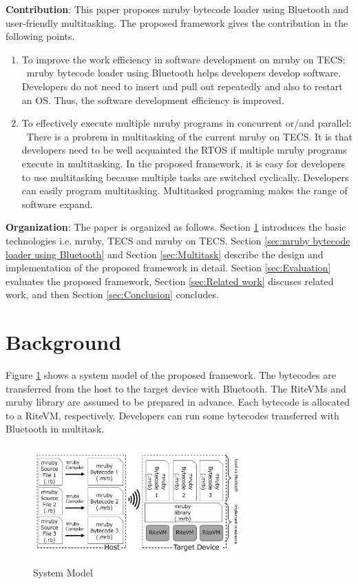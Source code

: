 \documentclass[conference,compsoc]{IEEEtran}
\begin{document}
{\bf Contribution}: This paper proposes mruby bytecode loader using Bluetooth and user-friendly multitasking.
The proposed framework gives the contribution in the following points. 
\begin{enumerate}
\item To improve the  work efficiency in software development on mruby on TECS: \mbox{}\\
\ mruby bytecode loader using Bluetooth helps developers develop software.
Developers do not need to insert and pull out repeatedly and also to restart an OS.
Thus, the software development efficiency is improved.
\item To effectively execute multiple mruby programs in concurrent or/and parallel: \mbox{}\\
\ There is a probrem in multitasking of the current mruby on TECS.
It is that developers need to be well acquainted the RTOS if multiple mruby programs execute in multitasking. 
In the proposed framework, it is easy for developers to use multitasking because multiple tasks are switched cyclically.
Developers can easily program multitasking.
Multitasked programing makes the range of software expand.
\end{enumerate}

{\bf Organization}: The paper is organized as follows.
Section \ref{sec:Background} introduces the basic technologies i.e. mruby, TECS and mruby on TECS.
Section \ref{sec:mruby bytecode loader using Bluetooth} and Section \ref{sec:Multitask} describe the design and implementation of the proposed framework in detail.
Section \ref{sec:Evaluation} evaluates the proposed framework, Section \ref{sec:Related work} discuses related work, and then Section \ref{sec:Conclusion} concludes.

\section{Background}
\label{sec:Background}
Figure \ref{fig:proposed} shows a system model of the proposed framework.
The bytecodes are transferred from the host to the target device with Bluetooth.
The RiteVMs and mruby library are assumed to be prepared in advance.
Each bytecode is allocated to a RiteVM, respectively.
Developers can run some bytecodes transferred with Bluetooth in multitask.

\begin{figure}[t]
    \centering
    \includegraphics[width=8cm,clip]{figure/proposed.pdf}
    \caption{System Model}
    \label{fig:proposed}
\end{figure}
\end{document}
